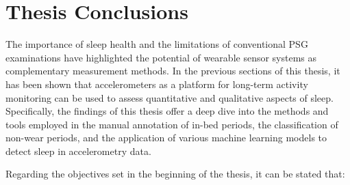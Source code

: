 \documentclass[
  10pt,
]{scrbook}
\begin{document}
\hypertarget{thesis-conclusions}{%
\chapter{Thesis Conclusions}\label{thesis-conclusions}}

The importance of sleep health and the limitations of conventional PSG
examinations have highlighted the potential of wearable sensor systems
as complementary measurement methods. In the previous sections of this
thesis, it has been shown that accelerometers as a platform for
long-term activity monitoring can be used to assess quantitative and
qualitative aspects of sleep. Specifically, the findings of this thesis
offer a deep dive into the methods and tools employed in the manual
annotation of in-bed periods, the classification of non-wear periods,
and the application of various machine learning models to detect sleep
in accelerometry data.

Regarding the objectives set in the beginning of the thesis, it can be
stated that:
\end{document}
